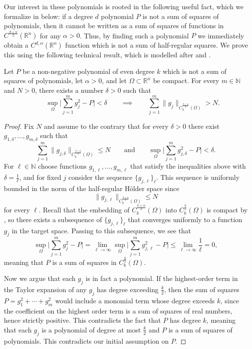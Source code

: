 \documentclass[oneside,hidelinks,indentfirst,10pt]{book}
\begin{document}
Our interest in these polynomials is rooted in the following useful fact, which we formalize in  below: if a degree \(d\) polynomial \(P\) is not a sum of squares of polynomials, then it cannot be written as a sum of squares of functions in \(C^\frac{d+\alpha}{2}(\mathbb{R}^n)\) for any \(\alpha>0\). Thus, by finding such a polynomial \(P\) we immediately obtain a \(C^{d,\alpha}(\mathbb{R}^n)\) function which is not a sum of half-regular squares. We prove this using the following technical result, which is modelled after \cite[Lemma 1.3]{Bony} and \cite[Lemma 5.2]{SOS_I}.


\begin{lem}\label{lem:contpoly}
Let \(P\) be a non-negative polynomial of even degree \(k\) which is not a sum of squares of polynomials, let \(\alpha>0\), and let \(\Omega\subset\mathbb{R}^n\) be compact. For every \(m\in\mathbb{N}\) and \(N>0\), there exists a number \(\delta>0\) such that 
\[
    \qquad\sup_{\Omega}\bigg|\sum_{j=1}^mg_j^2-P\bigg|<\delta\qquad\implies\qquad\sum_{j=1}^m\|g_j\|_{C_b^\frac{k+\alpha}{2}(\Omega)}>N.
\]
\end{lem}


\begin{proof}
Fix \(N\) and assume to the contrary that for every \(\delta>0\) there exist \(g_{1,\delta},\dots,g_{m,\delta}\) such that 
\[
    \sum_{j=1}^m\|g_{j,\delta}\|_{C_b^\frac{k+\alpha}{2}(\Omega)}\leq N\qquad\mathrm{and}\qquad\sup_{\Omega}\bigg|\sum_{j=1}^mg_{j,\delta}^2-P\bigg|<\delta.
\]
For \(\ell\in\mathbb{N}\) choose functions \(g_{1,\ell},\dots,g_{m,\ell}\) that satisfy the inequalities above with \(\delta=\frac{1}{\ell}\), and for fixed \(j\) consider the sequence \(\{g_{j,\ell}\}_{\ell}\). This sequence is uniformly bounded in the norm of the half-regular H\"older space since 
\[
    \|g_{j,\ell}\|_{C_b^\frac{k+\alpha}{2}(\Omega )}\leq N
\]
for every \(\ell\). Recall that the embedding of \(C_b^\frac{k+\alpha}{2}(\Omega)\) into \( C_b^\frac{k}{2}(\Omega)\) is compact by , so there exists a subsequence of \(\{g_{j,\ell}\}_{\ell}\) that converges uniformly to a function \(g_j\) in the target space. Passing to this subsequence, we see that
\[
    \sup_\Omega\bigg|\sum_{j=1}^mg_j^2-P\bigg|=\lim_{\ell\rightarrow\infty}\sup_\Omega\bigg|\sum_{j=1}^mg_{j,\ell}^2-P\bigg|\leq\lim_{\ell\rightarrow\infty}\frac{1}{\ell}=0,
\]
meaning that \(P\) is a sum of squares in \(C_b^\frac{k}{2}(\Omega)\). 


Now we argue that each \(g_j\) is in fact a polynomial. If the highest-order term in the Taylor expansion of any \(g_j\) has degree exceeding \(\frac{k}{2}\), then the sum of squares \(P=g_1^2+\cdots+g_m^2\) would include a monomial term whose degree exceeds \(k\), since the coefficient on the highest order term is a sum of squares of real numbers, hence strictly positive. This contradicts the fact that \(P\) has degree \(k\), meaning that each \(g_j\) is a polynomial of degree at most \(\frac{k}{2}\) and \(P\) is a sum of squares of polynomials. This contradicts our initial assumption on \(P\).
\end{proof}
\end{document}
